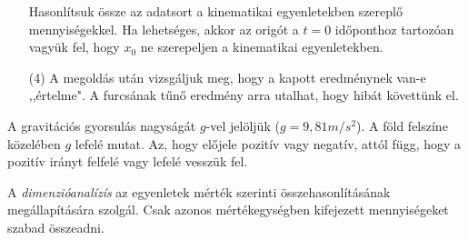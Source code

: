 \documentclass[../fizika.tex]{subfiles}
\begin{document}
\begin{multicols}{2}
\begin{itemize}
                            \noindent Hasonlítsuk össze az adatsort a kinematikai egyenletekben szereplő mennyiségekkel. Ha lehetséges, akkor az origót a $t = 0$ időponthoz tartozóan vagyük fel, hogy $x_0$ ne szerepeljen a kinematikai egyenletekben.
                            \item[(4)] A megoldás után vizsgáljuk meg, hogy a kapott eredménynek van-e ,,értelme". A furcsának tűnő eredmény arra utalhat, hogy hibát követtünk el.
                        \end{itemize}

                    A gravitációs gyorsulás nagyságát $g$-vel jelöljük ($g=9,81 m/s^2$). A föld felszíne közelében $g$ lefelé mutat. Az, hogy előjele pozitív vagy negatív, attól függ, hogy a pozitív irányt felfelé vagy lefelé vesszük fel.

                    A \textit{dimenzióanalízís} az egyenletek mérték szerinti összehasonlításának megállapítására szolgál. Csak azonos mértékegységben kifejezett mennyiségeket szabad összeadni.
                    \end{multicols}

                
\end{document}

